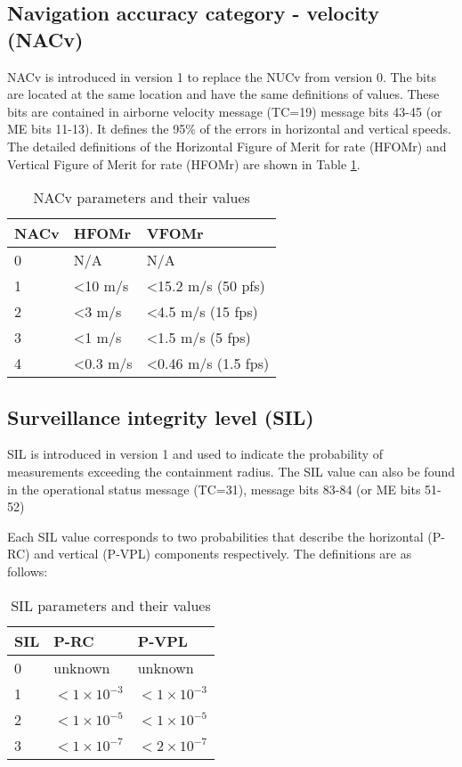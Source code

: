 \subsection{Navigation accuracy category - velocity (NACv)}

NACv is introduced in version 1 to replace the NUCv from version 0. The bits are located at the same location and have the same definitions of values. These bits are contained in airborne velocity message (TC=19) message bits 43-45 (or ME bits 11-13). It defines the 95\% of the errors in horizontal and vertical speeds. The detailed definitions of the Horizontal Figure of Merit for rate (HFOMr) and Vertical Figure of Merit for rate (HFOMr) are shown in Table \ref{tb:nacv-params}.

\begin{table}[!ht]
\caption{NACv parameters and their values}
\label{tb:nacv-params}
\begin{tabular}{|l|l|l|}
\hline
\textbf{NACv} & \textbf{HFOMr} & \textbf{VFOMr} \\ \hline
0 & N/A & N/A \\ \hline
1 & \textless 10 m/s & \textless 15.2 m/s (50 pfs) \\ \hline
2 & \textless 3 m/s & \textless 4.5 m/s (15 fps) \\ \hline
3 & \textless 1 m/s & \textless 1.5 m/s (5 fps) \\ \hline
4 & \textless 0.3 m/s & \textless 0.46 m/s (1.5 fps) \\ \hline
\end{tabular}
\end{table}


\subsection{Surveillance integrity level (SIL)}

SIL is introduced in version 1 and used to indicate the probability of measurements exceeding the containment radius. The SIL value can also be found in the operational status message (TC=31), message bits 83-84 (or ME bits 51-52)

Each SIL value corresponds to two probabilities that describe the horizontal (P-RC) and vertical (P-VPL) components respectively. The definitions are as follows:

\begin{table}[!ht]
\caption{SIL parameters and their values}
\label{tb:sil-params}
\begin{tabular}{|l|l|l|}
\hline
SIL & P-RC & P-VPL \\ \hline
0 & unknown & unknown \\ \hline
1 & $< 1 \times 10^{-3}$ & $< 1 \times 10^{-3}$ \\ \hline
2 & $< 1 \times 10^{-5}$ & $< 1 \times 10^{-5}$ \\ \hline
3 & $< 1 \times 10^{-7}$ & $< 2 \times 10^{-7}$ \\ \hline
\end{tabular}
\end{table}

